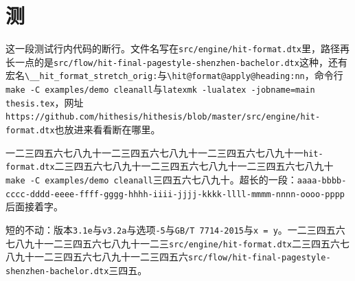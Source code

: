 \documentclass[stage=final,degree-level=doctor,campus=harbin,fontset=windows]{hithesis}
\begin{document}
\mainmatter
\chapter{测}

这一段测试行内代码的断行。文件名写在\verb|src/engine/hit-format.dtx|里，路径再长一点的是\verb|src/flow/hit-final-pagestyle-shenzhen-bachelor.dtx|这种，还有宏名\verb|\__hit_format_stretch_orig:|与\verb|\hit@format@apply@heading:nn|，命令行\verb|make -C examples/demo cleanall|与\verb|latexmk -lualatex -jobname=main thesis.tex|，网址\verb|https://github.com/hithesis/hithesis/blob/master/src/engine/hit-format.dtx|也放进来看看断在哪里。

一二三四五六七八九十一二三四五六七八九十一二三四五六七八九十一\verb|hit-format.dtx|二三四五六七八九十一二三四五六七八九十一二三四五六七八九十\verb|make -C examples/demo cleanall|三四五六七八九十。超长的一段：\verb|aaaa-bbbb-cccc-dddd-eeee-ffff-gggg-hhhh-iiii-jjjj-kkkk-llll-mmmm-nnnn-oooo-pppp|后面接着字。

短的不动：版本\verb|3.1e|与\verb|v3.2a|与选项\verb|-5|与\verb|GB/T 7714-2015|与\verb|x = y|。一二三四五六七八九十一二三四五六七八九十一二三\verb|src/engine/hit-format.dtx|二三四五六七八九十一二三四五六七八九十一二三四五六\verb|src/flow/hit-final-pagestyle-shenzhen-bachelor.dtx|三四五。
\end{document}
